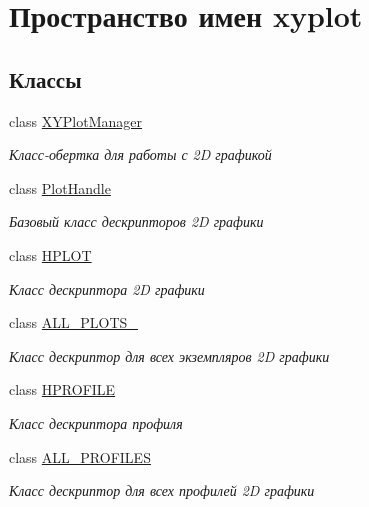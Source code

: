 \hypertarget{namespacexyplot}{\section{Пространство имен xyplot}
\label{namespacexyplot}
}
\subsection*{Классы}
\begin{DoxyCompactItemize}
\item 
class \hyperlink{classxyplot_1_1_x_y_plot_manager}{X\-Y\-Plot\-Manager}
\begin{DoxyCompactList}\small\item\em Класс-\/обертка для работы с 2\-D графикой \end{DoxyCompactList}\item 
class \hyperlink{classxyplot_1_1_plot_handle}{Plot\-Handle}
\begin{DoxyCompactList}\small\item\em Базовый класс дескрипторов 2\-D графики \end{DoxyCompactList}\item 
class \hyperlink{classxyplot_1_1_h_p_l_o_t}{H\-P\-L\-O\-T}
\begin{DoxyCompactList}\small\item\em Класс дескриптора 2\-D графики \end{DoxyCompactList}\item 
class \hyperlink{classxyplot_1_1_a_l_l___p_l_o_t_s__}{A\-L\-L\-\_\-\-P\-L\-O\-T\-S\-\_\-}
\begin{DoxyCompactList}\small\item\em Класс дескриптор для всех экземпляров 2\-D графики \end{DoxyCompactList}\item 
class \hyperlink{classxyplot_1_1_h_p_r_o_f_i_l_e}{H\-P\-R\-O\-F\-I\-L\-E}
\begin{DoxyCompactList}\small\item\em Класс дескриптора профиля \end{DoxyCompactList}\item 
class \hyperlink{classxyplot_1_1_a_l_l___p_r_o_f_i_l_e_s}{A\-L\-L\-\_\-\-P\-R\-O\-F\-I\-L\-E\-S}
\begin{DoxyCompactList}\small\item\em Класс дескриптор для всех профилей 2\-D графики \end{DoxyCompactList}\item 

\end{DoxyCompactItemize}

